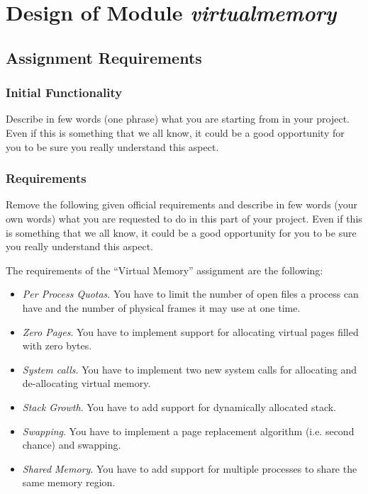 
\chapter{Design of Module \textit{virtualmemory}}

\section{Assignment Requirements}


\subsection{Initial Functionality}

Describe in few words (one phrase) what you are starting from in your project. Even if this is something that we all know, it could be a good opportunity for you to be sure you really understand this aspect.


\subsection{Requirements}

Remove the following given official requirements and describe in few words (your own words) what you are requested to do in this part of your project. Even if this is something that we all know, it could be a good opportunity for you to be sure you really understand this aspect. 


The requirements of the ``Virtual Memory'' assignment are the following:
\begin{itemize}
    \item \textit{Per Process Quotas}. You have to limit the number of open files a process can have
and the number of physical frames it may use at one time.

    \item \textit{Zero Pages}. You have to implement support for allocating virtual pages filled with
zero bytes.

    \item \textit{System calls}. You have to implement two new system calls for allocating and
de-allocating virtual memory.

		\item \textit{Stack Growth}. You have to add support for dynamically allocated stack.

    \item \textit{Swapping}. You have to implement a page replacement algorithm (i.e. second chance)
and swapping.

		\item \textit{Shared Memory}. You have to add support for multiple processes to share the same memory region.

\end{itemize}


